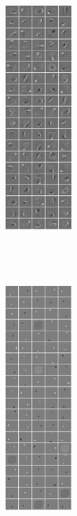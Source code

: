 \documentclass{article} %
\begin{document}
\begin{figure}
\centering 
\begin{subfigure}[b]{0.225\textwidth}
		\centering 
		\includegraphics[width=2.5cm, height=10cm]{.//strokes_full.png}
		\caption{}
	\end{subfigure} 
	\begin{subfigure}[b]{0.225\textwidth}
		\centering 
		\includegraphics[width=2.5cm, height=10cm]{.//MNIST_sat_linear_full.png}
		\caption{}
	\end{subfigure} 
	\begin{subfigure}[b]{0.2\textwidth}
		\centering 

\end{subfigure}
\end{figure}
\end{document}
